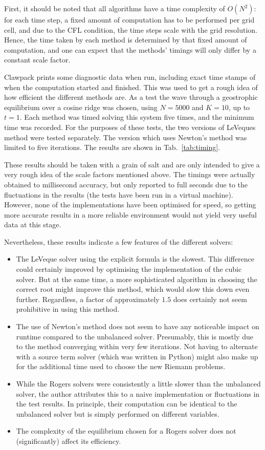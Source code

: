 First, it should be noted that all algorithms have a time complexity of $O(N^2)$: for each time step, a fixed amount of computation has to be performed per grid cell, and due to the CFL condition, the time steps scale with the grid resolution. Hence, the time taken by each method is determined by that fixed amount of computation, and one can expect that the methods' timings will only differ by a constant scale factor.

Clawpack prints some diagnostic data when run, including exact time stamps of when the computation started and finished. This was used to get a rough idea of how efficient the different methods are. As a test the wave through a geostrophic equilibrium over a cosine ridge was chosen, using $N = 5000$ and $K = 10$, up to $t = 1$. Each method was timed solving this system five times, and the minimum time was recorded. For the purposes of these tests, the two versions of LeVeques method were tested separately. The version which uses Newton's method was limited to five iterations. The results are shown in Tab.~\ref{tab:timing}.

These results should be taken with a grain of salt and are only intended to give a very rough idea of the scale factors mentioned above. The timings were actually obtained to millisecond accuracy, but only reported to full seconds due to the fluctuations in the results (the tests have been run in a virtual machine). However, none of the implementations have been optimised for speed, so getting more accurate results in a more reliable environment would not yield very useful data at this stage.

Nevertheless, these results indicate a few features of the different solvers:

\begin{itemize}
  \item The LeVeque solver using the explicit formula is the slowest. This difference could certainly improved by optimising the implementation of the cubic solver. But at the same time, a more sophisticated algorithm in choosing the correct root might improve this method, which would slow this down even further. Regardless, a factor of approximately $1.5$ does certainly not seem prohibitive in using this method.
  \item The use of Newton's method does not seem to have any noticeable impact on runtime compared to the unbalanced solver. Presumably, this is mostly due to the method converging within very few iterations. Not having to alternate with a source term solver (which was written in Python) might also make up for the additional time used to choose the new Riemann problems.
  \item While the Rogers solvers were consistently a little slower than the unbalanced solver, the author attributes this to a naive implementation or fluctuations in the test results. In principle, their computation can be identical to the unbalanced solver but is simply performed on different variables.
  \item The complexity of the equilibrium chosen for a Rogers solver does not (significantly) affect its efficiency.
\end{itemize}